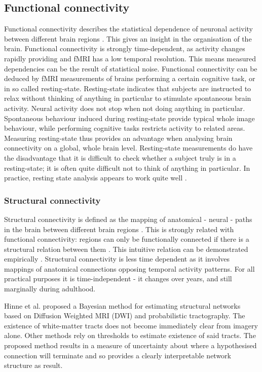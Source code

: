 \documentclass[a4paper, 10pt, english, onecolumn]{article}
\begin{document}
\subsection{Functional connectivity}
Functional connectivity describes the statistical dependence of neuronal activity between different brain regions \cite{friston1993functional}.
This gives an insight in the organisation of the brain.
Functional connectivity is strongly time-dependent, as activity changes rapidly providing and fMRI has a low temporal resolution.
This means measured dependencies can be the result of statistical noise.
Functional connectivity can be deduced by fMRI measurements of brains performing a certain cognitive task, or in so called resting-state.
Resting-state indicates that subjects are instructed to relax without thinking of anything in particular to stimulate spontaneous brain activity.
Neural activity does not stop when not doing anything in particular.
Spontaneous behaviour induced during resting-state provide typical whole image behaviour, while performing cognitive tasks restricts activity to related areas.
Measuring resting-state thus provides an advantage when analysing brain connectivity on a global, whole brain level.
Resting-state measurements do have the disadvantage that it is difficult to check whether a subject truly is in a resting-state; it is often quite difficult not to think of anything in particular.
In practice, resting state analysis appears to work quite well \cite{Lowe2000, doria2010, Bullmore2009}.

\subsubsection{Structural connectivity}
Structural connectivity is defined as the mapping of anatomical - neural - paths in the brain between different brain regions \cite{friston1994}.
This is strongly related with functional connectivity: regions can only be functionally connected if there is a structural relation between them \cite{cabral2012}.
This intuitive relation can be demonstrated empirically \cite{vandenheuvel2009}.
Structural connectivity is less time dependent as it involves mappings of anatomical connections opposing temporal activity patterns.
For all practical purposes it is time-independent - it changes over years, and still marginally during adulthood.

Hinne et al. \cite{hinne2013} proposed a Bayesian method for estimating structural networks based on Diffusion Weighted MRI (DWI) and probabilistic tractography.
The existence of white-matter tracts does not become immediately clear from imagery alone.
Other methods rely on thresholds to estimate existence of said tracts.
The proposed method results in a measure of uncertainty about where a hypothesised connection will terminate and so provides a clearly interpretable network structure as result.
\end{document}
